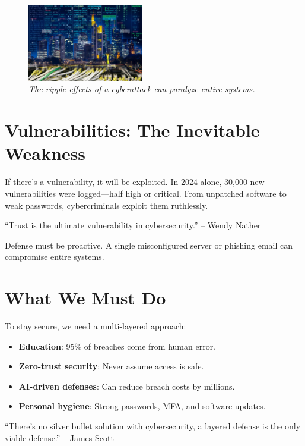 \begin{figure}[h]
  \centering
  \includegraphics[width=0.45\textwidth]{city.png}
  \caption{\textit{The ripple effects of a cyberattack can paralyze entire systems.}}
\end{figure}

\section*{Vulnerabilities: The Inevitable Weakness}
If there's a vulnerability, it will be exploited. In 2024 alone, 30,000 new vulnerabilities were logged—half high or critical. From unpatched software to weak passwords, cybercriminals exploit them ruthlessly.

\begin{quoting}
``Trust is the ultimate vulnerability in cybersecurity.'' -- Wendy Nather
\end{quoting}

Defense must be proactive. A single misconfigured server or phishing email can compromise entire systems.

\section*{What We Must Do}
To stay secure, we need a multi-layered approach:

\begin{itemize}
  \item \textbf{Education}: 95\% of breaches come from human error.
  \item \textbf{Zero-trust security}: Never assume access is safe.
  \item \textbf{AI-driven defenses}: Can reduce breach costs by millions.
  \item \textbf{Personal hygiene}: Strong passwords, MFA, and software updates.
\end{itemize}

\begin{quoting}
``There's no silver bullet solution with cybersecurity, a layered defense is the only viable defense.'' -- James Scott
\end{quoting}

